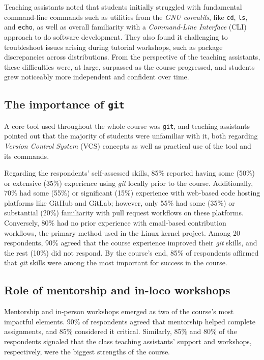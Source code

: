 Teaching assistants noted that students initially struggled with fundamental
command-line commands such as utilities from the \textit{GNU coreutils}, like
\texttt{cd}, \texttt{ls}, and \texttt{echo}, as well as overall familiarity with
a \textit{Command-Line Interface} (CLI) approach to do software development.
They also found it challenging to troubleshoot issues arising during tutorial
workshops, such as package discrepancies across distributions. From the
perspective of the teaching assistants, these difficulties were, at large,
surpassed as the course progressed, and students grew noticeably more
independent and confident over time.

\subsection{The importance of \texttt{git}}

A core tool used throughout the whole course was \texttt{git}, and teaching
assistants pointed out that the majority of students were unfamiliar with it,
both regarding \textit{Version Control System} (VCS) concepts as well as
practical use of the tool and its commands.

Regarding the respondents' self-assessed skills, 85\% reported having some
(50\%) or extensive (35\%) experience using \textit{git} locally prior to the
course. Additionally, 70\% had some (55\%) or significant (15\%) experience with
web-based code hosting platforms like GitHub and GitLab; however, only 55\% had
some (35\%) or substantial (20\%) familiarity with pull request workflows on
these platforms. Conversely, 80\% had no prior experience with email-based
contribution workflows, the primary method used in the Linux kernel project.
Among 20 respondents, 90\% agreed that the course experience improved their
\textit{git} skills, and the rest (10\%) did not respond. By the course's end,
85\% of respondents affirmed that \textit{git} skills were among the most
important for success in the course.

\subsection{Role of mentorship and in-loco workshops}
\label{sec:results:role-mentors-workshops}

Mentorship and in-person workshops emerged as two of the course's most impactful
elements. 90\% of respondents agreed that mentorship helped complete
assignments, and 85\% considered it critical. Similarly, 85\% and 80\% of the
respondents signaled that the class teaching assistants' support and workshops,
respectively, were the biggest strengths of the course.

